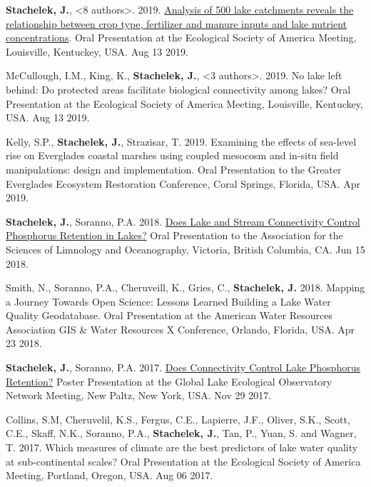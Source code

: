 \documentclass[11pt]{article}
\makeatletter
\newlength{\bibhang}
\newlength{\bibsep}
 {\@listi \global\bibsep\itemsep \global\advance\bibsep by\parsep}
\newenvironment{bibenum*}
  {\renewcommand\labelenumi{[\theenumi]}%
   \etaremune[
     topsep=0pt,
     itemsep=\bibsep,
     parsep=0pt,partopsep=0pt,
     itemindent=-\bibhang,
     leftmargin=0.8em
     ]
     }
  {\endetaremune}
\makeatother
\begin{document}
\begin{bibenum*}
    \item \textbf{Stachelek, J.}, <8 authors>. 2019. \href{https://doi.org/10.6084/m9.figshare.12486164.v2}{Analysis of 500 lake catchments reveals the relationship between crop type, fertilizer and manure inputs and lake nutrient concentrations}. Oral Presentation at the Ecological Society of America Meeting, Louisville, Kentuckey, USA. Aug 13 2019.

    \item McCullough, I.M., King, K., \textbf{Stachelek, J.}, <3 authors>. 2019. No lake left behind: Do protected areas facilitate biological connectivity among lakes? Oral Presentation at the Ecological Society of America Meeting, Louisville, Kentuckey, USA. Aug 13 2019.

    \item Kelly, S.P., \textbf{Stachelek, J.}, Strazisar, T. 2019. Examining the effects of sea-level rise on Everglades coastal marshes using coupled mesocosm and in-situ field manipulations: design and implementation. Oral Presentation to the Greater Everglades Ecosystem Restoration Conference, Coral Springs, Florida, USA. Apr 2019.

    \item \textbf{Stachelek, J.}, Soranno, P.A. 2018. \href{https://doi.org/10.6084/m9.figshare.5903875.v2}{Does Lake and Stream Connectivity Control Phosphorus Retention in Lakes?} Oral Presentation to the Association for the Sciences of Limnology and Oceanography, Victoria, British Columbia, CA. Jun 15 2018.

    \item Smith, N., Soranno, P.A., Cheruveill, K., Gries, C., \textbf{Stachelek, J.} 2018. Mapping a Journey Towards Open Science: Lessons Learned Building a Lake Water Quality Geodatabase. Oral Presentation at the American Water Resources Association GIS \& Water Resources X Conference, Orlando, Florida, USA. Apr 23 2018.

    \item \textbf{Stachelek, J.}, Soranno, P.A. 2017. \href{https://doi.org/10.6084/m9.figshare.9638735.v1}{Does Connectivity Control Lake Phosphorus Retention?} Poster Presentation at the Global Lake Ecological Observatory Network Meeting, New Paltz, New York, USA. Nov 29 2017.

    \item Collins, S.M, Cheruvelil, K.S., Fergus, C.E., Lapierre, J.F., Oliver, S.K., Scott, C.E., Skaff, N.K., Soranno, P.A., \textbf{Stachelek, J.}, Tan, P., Yuan, S. and Wagner, T. 2017. Which measures of climate are the best predictors of lake water quality at sub-continental scales? Oral Presentation at the Ecological Society of America Meeting, Portland, Oregon, USA. Aug 06 2017.


\end{bibenum*}
\end{document}
